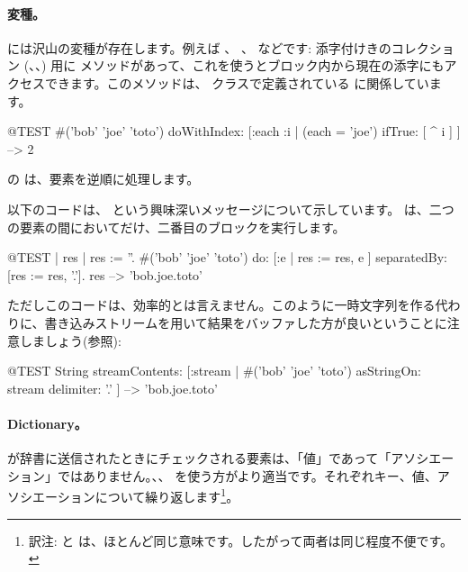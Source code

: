 \documentclass[a4paper,10pt,twoside]{book}
\begin{document}
\paragraph{変種。}  には沢山の変種が存在します。例えば 、 、  などです:
添字付けきのコレクション (、、) 用に  メソッドがあって、これを使うとブロック内から現在の添字にもアクセスできます。このメソッドは、 クラスで定義されている  に関係しています。

\begin{code}{@TEST}
#('bob' 'joe' 'toto') doWithIndex: [:each :i | (each = 'joe') ifTrue: [ ^ i ] ] --> 2
\end{code}

 の  は、要素を逆順に処理します。

以下のコードは、 という興味深いメッセージについて示しています。
 は、二つの要素の間においてだけ、二番目のブロックを実行します。
\begin{code}{@TEST | res | }
res := ''.
#('bob' 'joe' 'toto') do: [:e | res := res, e ] separatedBy: [res := res, '.'].
res --> 'bob.joe.toto'
\end{code}
\noindent
ただしこのコードは、効率的とは言えません。このように一時文字列を作る代わりに、書き込みストリームを用いて結果をバッファした方が良いということに注意しましょう(参照):
\begin{code}{@TEST}
String streamContents: [:stream | #('bob' 'joe' 'toto') asStringOn: stream delimiter: '.' ] --> 'bob.joe.toto'
\end{code}



\paragraph{Dictionary。}
 が辞書に送信されたときにチェックされる要素は、「値」であって「アソシエーション」ではありません。、、  を使う方がより適当です。それぞれキー、値、アソシエーションについて繰り返します\footnote{訳注:  と  は、ほとんど同じ意味です。したがって両者は同じ程度不便です。}。
\end{document}
